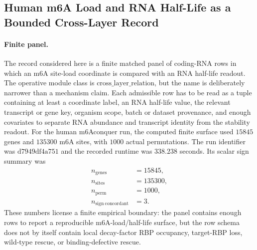 \subsection{Human m6A Load and RNA Half-Life as a Bounded Cross-Layer Record}\label{sec:bioreality-human-m6a-load-halflife-crossorganism-human-m6aconquer}

\paragraph{Finite panel.}
The record considered here is a finite matched panel of coding-RNA rows in which an m6A site-load coordinate is compared with an RNA half-life readout.  The operative module class is $\mathrm{cross\_layer\_relation}$, but the name is deliberately narrower than a mechanism claim.  Each admissible row has to be read as a tuple containing at least a coordinate label, an RNA half-life value, the relevant transcript or gene key, organism scope, batch or dataset provenance, and enough covariates to separate RNA abundance and transcript identity from the stability readout.  For the human m6Aconquer run, the computed finite surface used $15845$ genes and $135300$ m6A sites, with $1000$ actual permutations.  The run identifier was $\mathrm{d7949df4a751}$ and the recorded runtime was $338.238$ seconds.  Its scalar sign summary was
$$\begin{aligned}
  n_{\mathrm{genes}} &= 15845,\\
  n_{\mathrm{sites}} &= 135300,\\
  n_{\mathrm{perm}} &= 1000,\\
  n_{\mathrm{sign\ concordant}} &= 3.
\end{aligned}$$
These numbers license a finite empirical boundary: the panel contains enough rows to report a reproducible m6A-load/half-life surface, but the row schema does not by itself contain local decay-factor RBP occupancy, target-RBP loss, wild-type rescue, or binding-defective rescue.


